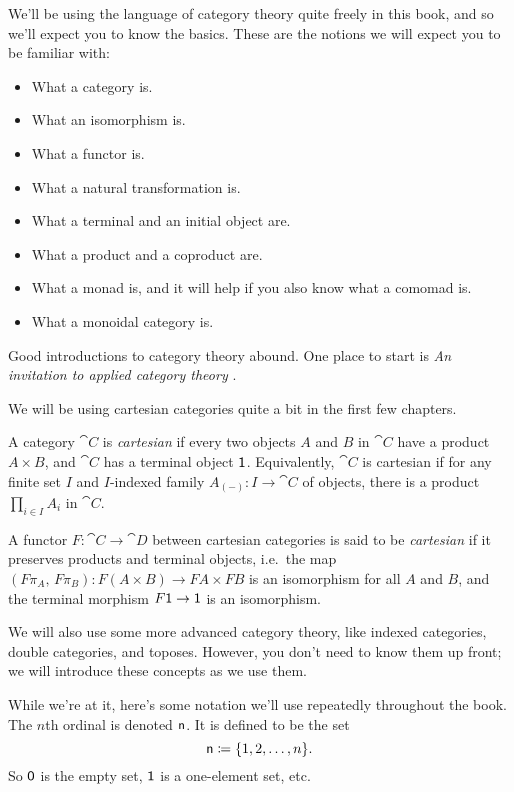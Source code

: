 \documentclass[DynamicalBook]{subfiles}
\begin{document}
We'll be using the language of category theory quite freely in this book, and so
we'll expect you to know the basics. These are the notions we will expect you to
be familiar with:
\begin{itemize}
\item What a category is.
\item What an isomorphism is.
\item What a functor is.
\item What a natural transformation is.
\item What a terminal and an initial object are.
\item What a product and a coproduct are.
\item What a monad is, and it will help if you also know what a comomad is.
  \item What a monoidal category is.
\end{itemize}

Good introductions to category theory abound. One place to start is \emph{An invitation to applied category theory} \cite{fong2019seven}.

We will be using cartesian categories quite a bit in the first few chapters.
\begin{definition}\label{def.cartesian_category}
  A category $\cat{C}$ is \emph{cartesian} if every two objects $A$ and $B$ in
  $\cat{C}$ have a product $A \times B$, and $\cat{C}$ has a terminal object
  $\mathsf{1}$. Equivalently, $\cat{C}$ is cartesian if for any finite set $I$ and
  $I$-indexed family $A_{(-)} : I \to \cat{C}$ of objects, there is a product
  $\prod_{i \in I} A_i$ in $\cat{C}$.

  A functor $F : \cat{C} \to \cat{D}$ between cartesian categories is said to be
  \emph{cartesian} if it preserves products and terminal objects, i.e.\ the
  map $(F\pi_A,\, F\pi_B) : F(A \times B) \to FA \times FB$ is an isomorphism
  for all $A$ and $B$, and the terminal morphism $F\mathsf{1} \to \mathsf{1}$ is an
  isomorphism. 
\end{definition}

We will also use some more advanced category theory, like indexed
categories, double categories, and toposes. However, you don't need to know them up front; we will introduce these concepts
as we use them.

While we're at it, here's some notation we'll use repeatedly throughout the book. The $n$th ordinal is denoted $\mathsf{n}$. It is defined to be the set
\[
\mathsf{n}\coloneqq\{1,2,\ldots,n\}.
\]
So $\mathsf{0}$ is the empty set, $\mathsf{1}$ is a one-element set, etc.
\end{document}
